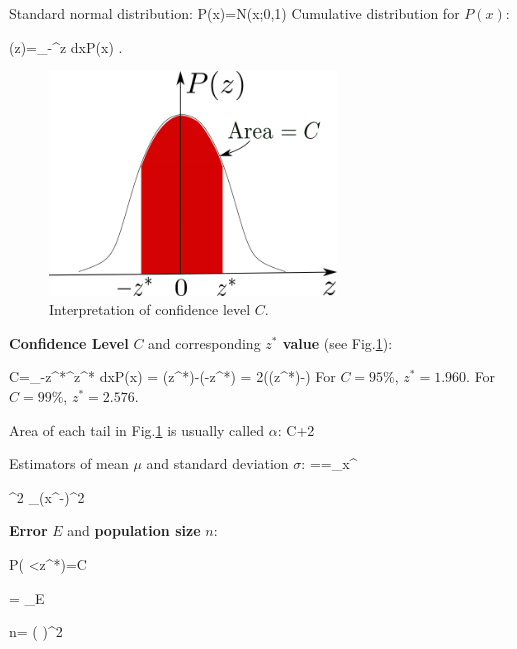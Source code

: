 Standard normal distribution:
\beq
P(x)=N(x;0,1)
\eeq
Cumulative distribution for $P(x)$:

\beq
\Phi(z)=\int_{-\infty}^z dx\;P(x)
\;.
\eeq

\begin{figure}[h!]
\centering
\includegraphics[width=3in]
{error-bars.png}
\caption{
Interpretation
of confidence level $C$.} 
\label{fig-error-bars}
\end{figure}

{\bf Confidence Level} $C$
and corresponding {\bf $z^*$ value}
(see Fig.\ref{fig-error-bars}):

\beq
C=\int_{-z^*}^{z^*} dx\;P(x) = 
\Phi(z^*)-\Phi(-z^*)
=
2\left(\Phi(z^*)-\right)
\eeq
For $C=95\%$,
$z^*=1.960$.
For $C=99\%$, $z^*=2.576$.

Area of each tail 
in Fig.\ref{fig-error-bars} is
usually called $\alpha$:
\beq
C+2
\eeq  

Estimators of 
mean $\mu$  and 
standard deviation $\sigma$:
\beq
\hat{\mu}==\sum_\s x^\s
\eeq

\beq
\hat{\sigma}^2
\sum_\s (x^\s-)^2
\eeq



{\bf Error} $E$ and {\bf population
size} $n$:

\beq
P\left(
<z^*\right)=C
\eeq

\beq
{} =
 \pm 
{}_{E}
\eeq

\beq
n= \left(
\right)^2
\eeq








